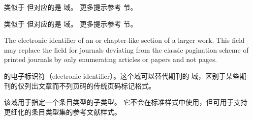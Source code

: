 \begin{fieldlist}



类似于  但对应的是  域。
更多提示参考  节。




类似于  但对应的是  域。
更多提示参考  节。



The electronic identifier of an  or chapter-like section of a larger work. This field may replace the  field for journals deviating from the classic pagination scheme of printed journals by only enumerating articles or papers and not pages.


 的电子标识符（electronic identifier）。这个域可以替代期刊的
域，区别于某些期刊的仅列出文章而不列页码的传统页码标记格式。




该域用于指定一个条目类型的子类型。
它不会在标准样式中使用，但可用于支持更细化的条目类型集的参考文献样式。




\end{fieldlist}
